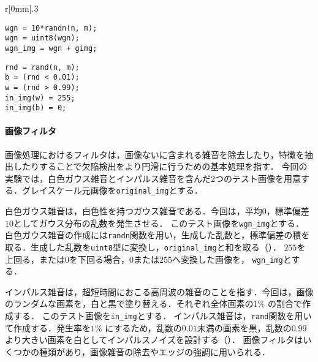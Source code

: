 \begin{wrapfigure}{r}[0mm]{.3\textwidth}
    \vspace{-1cm}
    \begin{lstlisting}[caption={白色ガウス雑音画像の生成},label={src:白色ガウス雑音画像の生成}]
% 画像サイズ : n x m
wgn = 10*randn(n, m);
wgn = uint8(wgn);
wgn_img = wgn + gimg;
    \end{lstlisting}
    \begin{lstlisting}[caption={インパルス雑音画像の生成},label={src:インパルス雑音画像の生成}]
% 画像サイズ : n x m
rnd = rand(n, m);
b = (rnd < 0.01);
w = (rnd > 0.99);
in_img(w) = 255;
in_img(b) = 0;
    \end{lstlisting}
    \vspace{-.5cm}
\end{wrapfigure}
\paragraph{画像フィルタ}
画像処理におけるフィルタは，画像ないに含まれる雑音を除去したり，特徴を抽出したりすることで欠陥検出をより円滑に行うための基本処理を指す\cite{画像フィルタ}．
\newcommand{\originimg}{\texttt{original\_img}}
\newcommand{\wgnimg}{\texttt{wgn\_img}}
\newcommand{\inimg}{\texttt{in\_img}}
今回の実験では，白色ガウス雑音とインパルス雑音を含んだ2つのテスト画像を用意する．グレイスケール元画像を\originimg とする．\par
白色ガウス雑音は，白色性を持つガウス雑音である．今回は，平均\(0\)，標準偏差\(10\)としてガウス分布の乱数を発生させる．
このテスト画像を\wgnimg とする．
白色ガウス雑音の作成には\texttt{randn}関数を用い，生成した乱数と，標準偏差の積を取る．生成した乱数を\texttt{uint8}型に変換し，\originimg と和を取る（）．
\(255\)を上回る，または\(0\)を下回る場合，\(0\)または\(255\)へ変換した画像を， \wgnimg とする．\par
インパルス雑音は，超短時間におこる高周波の雑音のことを指す．今回は，画像のランダムな画素を，白と黒で塗り替える．それぞれ全体画素の1\(\%\) の割合で作成する．
このテスト画像を\inimg とする．
インパルス雑音は，\texttt{rand}関数を用いて作成する．発生率を\(1\%\) にするため，乱数の\(0.01\)未満の画素を黒，乱数の\(0.99\)より大きい画素を白としてインパルスノイズを設計する（）．
画像フィルタはいくつかの種類があり，画像雑音の除去やエッジの強調に用いられる．
